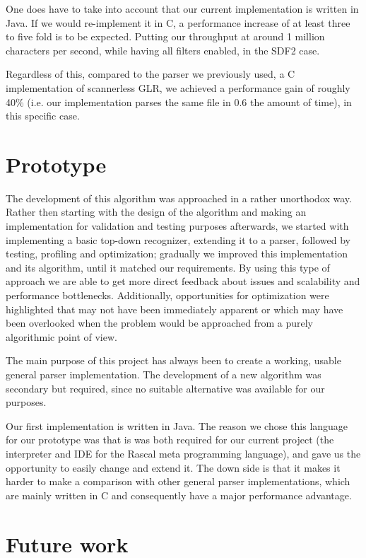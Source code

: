 \documentclass[a4paper,10pt]{article}
\begin{document}
One does have to take into account that our current implementation is written in Java. If we would re-implement it in C, a performance increase of at least three to five fold is to be expected. Putting our throughput at around 1 million characters per second, while having all filters enabled, in the SDF2 case.

Regardless of this, compared to the parser we previously used, a C implementation of scannerless GLR, we achieved a performance gain of roughly 40\% (i.e. our implementation parses the same file in 0.6 the amount of time), in this specific case.

\section{Prototype}

The development of this algorithm was approached in a rather unorthodox way. Rather then starting with the design of the algorithm and making an implementation for validation and testing purposes afterwards, we started with implementing a basic top-down recognizer, extending it to a parser, followed by testing, profiling and optimization; gradually we improved this implementation and its algorithm, until it matched our requirements. By using this type of approach we are able to get more direct feedback about issues and scalability and performance bottlenecks. Additionally, opportunities for optimization were highlighted that may not have been immediately apparent or which may have been overlooked when the problem would be approached from a purely algorithmic point of view.

The main purpose of this project has always been to create a working, usable general parser implementation. The development of a new algorithm was secondary but required, since no suitable alternative was available for our purposes.

Our first implementation is written in Java. The reason we chose this language for our prototype was that is was both required for our current project (the interpreter and IDE for the Rascal meta programming language), and gave us the opportunity to easily change and extend it. The down side is that it makes it harder to make a comparison with other general parser implementations, which are mainly written in C and consequently have a major performance advantage.

\section{Future work}
\end{document}
